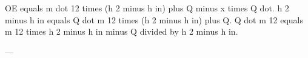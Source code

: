 OE equals m dot 12 times (h 2 minus h in) plus Q minus x times Q dot.  
h 2 minus h in equals Q dot m 12 times (h 2 minus h in) plus Q.  
Q dot m 12 equals m 12 times h 2 minus h in minus Q divided by h 2 minus h in.  

---